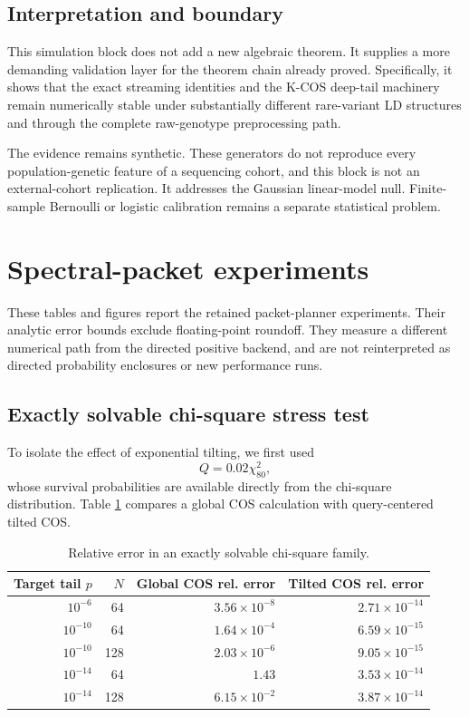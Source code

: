 \subsection{Interpretation and boundary}

This simulation block does not add a new algebraic theorem.  It supplies a
more demanding validation layer for the theorem chain already proved.
Specifically, it shows that the exact streaming identities and the K-COS
deep-tail machinery remain numerically stable under substantially different
rare-variant LD structures and through the complete raw-genotype preprocessing
path.

The evidence remains synthetic.  These generators do not reproduce every
population-genetic feature of a sequencing cohort, and this block is not an
external-cohort replication. It addresses the Gaussian linear-model null.
Finite-sample Bernoulli or logistic calibration remains a separate statistical
problem.



\section{Spectral-packet experiments}
These tables and figures report the retained packet-planner experiments.
Their analytic error bounds exclude floating-point roundoff. They measure a
different numerical path from the directed positive backend, and are not
reinterpreted as directed probability enclosures or new performance runs.

\subsection{Exactly solvable chi-square stress test}

To isolate the effect of exponential tilting, we first used
\[
Q=0.02\chi^2_{80},
\]
whose survival probabilities are available directly from the chi-square distribution. Table \ref{tab:chi} compares a global COS calculation with query-centered tilted COS.

\begin{table}[htbp]
\centering
\caption{Relative error in an exactly solvable chi-square family.}
\label{tab:chi}
\begin{tabular}{rrrr}
\toprule
Target tail $p$ & $N$ & Global COS rel. error & Tilted COS rel. error\\
\midrule
$10^{-6}$  & 64  & $3.56\times10^{-8}$ & $2.71\times10^{-14}$\\
$10^{-10}$ & 64  & $1.64\times10^{-4}$ & $6.59\times10^{-15}$\\
$10^{-10}$ & 128 & $2.03\times10^{-6}$ & $9.05\times10^{-15}$\\
$10^{-14}$ & 64  & $1.43$              & $3.53\times10^{-14}$\\
$10^{-14}$ & 128 & $6.15\times10^{-2}$ & $3.87\times10^{-14}$\\
\bottomrule
\end{tabular}
\end{table}

